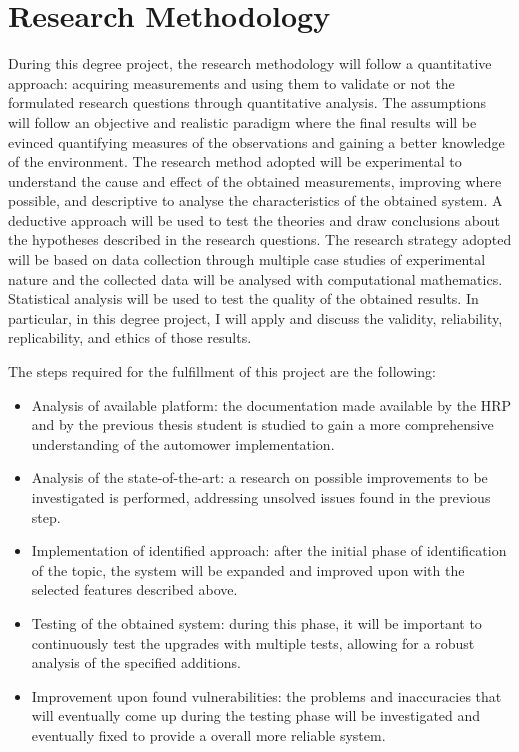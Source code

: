 \section{Research Methodology}
During this degree project, the research methodology\cite{RESEARCHMETHOD} will follow a quantitative approach: acquiring measurements and using them to validate or not the formulated research questions through quantitative analysis. 
The assumptions will follow an objective and realistic paradigm where the final results will be evinced quantifying measures of the observations and gaining a better knowledge of the environment.
The research method adopted will be experimental to understand the cause and effect of the obtained measurements, improving where possible, and descriptive to analyse the characteristics of the obtained system.
A deductive approach will be used to test the theories and draw conclusions about the hypotheses described in the research questions.
The research strategy adopted will be based on data collection through multiple case studies of experimental nature and the collected data will be analysed with computational mathematics. Statistical analysis will be used to test the quality of the obtained results. In particular, in this degree project, I will apply and discuss the validity, reliability, replicability, and ethics of those results.

The steps required for the fulfillment of this project are the following:
\begin{itemize}
    \item Analysis of available platform: the documentation made available by the \gls{HRP} and by the previous thesis student is studied to gain a more comprehensive understanding of the automower implementation.
    \item Analysis of the state-of-the-art: a research on possible improvements to be investigated is performed, addressing unsolved issues found in the previous step.
    \item Implementation of identified approach: after the initial phase of identification of the topic, the system will be expanded and improved upon with the selected features described above.
    \item Testing of the obtained system: during this phase, it will be important to continuously test the upgrades with multiple tests, allowing for a robust analysis of the specified additions.
    \item Improvement upon found vulnerabilities: the problems and inaccuracies that will eventually come up during the testing phase will be investigated and eventually fixed to provide a overall more reliable system. 
\end{itemize}

